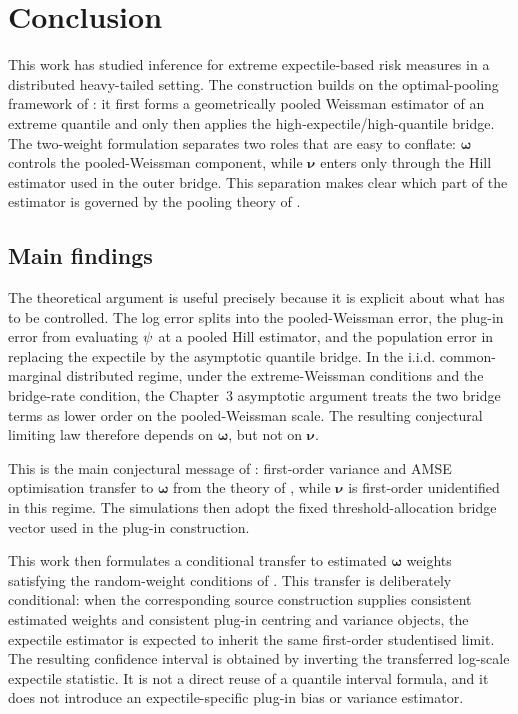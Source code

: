\chapter{Conclusion}
\label{ch:conclusion}

This work has studied inference for extreme expectile-based risk measures in
a distributed heavy-tailed setting. The construction builds on the
optimal-pooling framework of \textcite{DaouiaPadoanStupfler2021}: it first
forms a geometrically pooled Weissman estimator of an extreme quantile and only
then applies the high-expectile/high-quantile bridge. The two-weight
formulation separates two roles that are easy to conflate:
\(\bm\omega\) controls the pooled-Weissman
component, while \(\bm\nu\) enters only through the Hill estimator used in the
outer bridge. This separation makes clear which part of the estimator is
governed by the pooling theory of \textcite{DaouiaPadoanStupfler2021}.

\section{Main findings}
\label{sec:conclusion:findings}

The theoretical argument is useful precisely because it is explicit about what
has to be controlled. The log error splits into the pooled-Weissman error, the
plug-in error from evaluating \(\psi\) at a pooled Hill estimator, and the
population error in replacing the expectile by the asymptotic quantile bridge.
In the i.i.d. common-marginal distributed regime, under the extreme-Weissman
conditions and the bridge-rate condition, the Chapter~3 asymptotic argument
treats the two bridge terms as lower order on the pooled-Weissman scale. The
resulting conjectural limiting law therefore depends on \(\bm\omega\), but not
on \(\bm\nu\).

This is the main conjectural message of : first-order
variance and AMSE optimisation transfer to \(\bm\omega\) from the theory of
\textcite{DaouiaPadoanStupfler2021}, while \(\bm\nu\) is first-order
unidentified in this regime. The simulations then adopt the fixed
threshold-allocation bridge vector used in the plug-in construction.

This work then formulates a conditional transfer to estimated \(\bm\omega\)
weights satisfying the random-weight conditions of
\textcite[Supplementary Material, Theorem~A.1; Theorem~2 and Corollary~8]{DaouiaPadoanStupfler2021}.
This transfer is deliberately conditional: when the corresponding source
construction supplies consistent estimated weights and consistent
plug-in centring and variance objects, the expectile estimator is expected to
inherit the same first-order studentised limit. The resulting
confidence interval is obtained by inverting the transferred log-scale
expectile statistic. It is not a direct reuse of a quantile interval formula,
and it does not introduce an expectile-specific plug-in bias or variance
estimator.

